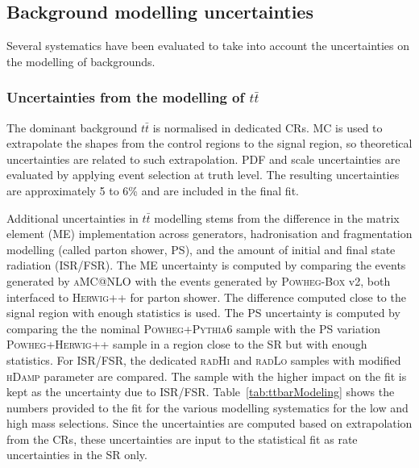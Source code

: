 \subsection{Background modelling uncertainties}
Several systematics have been evaluated to take into account the
uncertainties on the modelling of backgrounds. 

\subsubsection{Uncertainties from the modelling of $t\bar{t}$}
\label{sec:topsys}
The dominant background $t\bar{t}$ is normalised in dedicated CRs. MC is used to extrapolate the shapes from the control regions to the signal region, so theoretical uncertainties are related to such extrapolation. PDF and scale uncertainties are evaluated by applying event selection at truth level. The resulting uncertainties are approximately 5 to 6\% and are included in the final fit.  

Additional uncertainties in $t\bar{t}$ modelling stems from the difference in the matrix element (ME) implementation across generators, hadronisation and fragmentation modelling (called parton shower, PS), and the amount of initial and final state radiation (ISR/FSR). The ME uncertainty is computed by comparing the events generated by \textsc{aMC@NLO} with the events generated by \textsc{Powheg-Box} v2, both interfaced to \textsc{Herwig++}  for parton shower. The difference computed close to the signal region with enough statistics is used. The PS uncertainty is computed by comparing the the nominal \textsc{Powheg+Pythia6} sample with the PS variation \textsc{Powheg+Herwig++} sample in a region close to the SR but with enough statistics. For ISR/FSR, the dedicated \textsc{radHi} and \textsc{radLo} samples with modified \textsc{hDamp} parameter are compared. The sample with the higher impact on the fit is kept as the uncertainty due to ISR/FSR. Table~\ref{tab:ttbarModeling} shows the numbers provided to the fit for the various \ttbar modelling systematics for the low and high mass selections. Since the uncertainties are computed based on extrapolation from the CRs, these uncertainties are input to the statistical fit as rate uncertainties in the SR only. 

